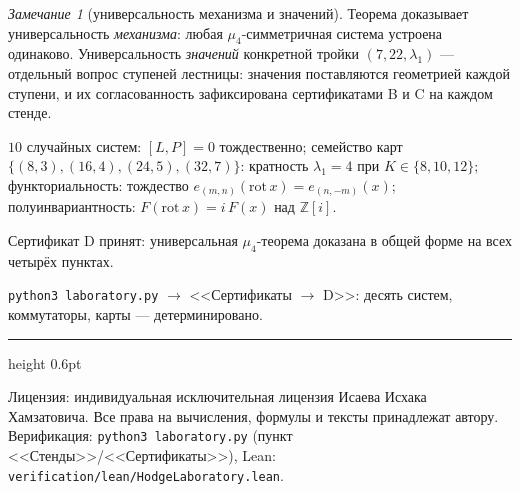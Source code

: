 \documentclass[11pt,a4paper]{article}
\theoremstyle{plain}
\theoremstyle{definition}
\theoremstyle{remark}
\newtheorem{remark}[theorem]{Замечание}
\newcommand{\ZZ}{\mathbb{Z}}
\begin{document}
\begin{remark}[универсальность механизма и значений]
Теорема доказывает универсальность \emph{механизма}: любая
$\mu_4$-симметричная система устроена одинаково. Универсальность
\emph{значений} конкретной тройки $(7,22,\lambda_1)$ ---
отдельный вопрос ступеней лестницы: значения поставляются
геометрией каждой ступени, и их согласованность зафиксирована
сертификатами B и C на каждом стенде.
\end{remark}

\begin{databox}[проверки]
$10$ случайных систем: $[L,P]=0$ тождественно; семейство карт
$\{(8,3),(16,4),(24,5),(32,7)\}$: кратность $\lambda_1=4$ при
$K\in\{8,10,12\}$; функториальность: тождество
$e_{(m,n)}(\mathrm{rot}\,x)=e_{(n,-m)}(x)$; полуинвариантность:
$F(\mathrm{rot}\,x)=i\,F(x)$ над $\ZZ[i]$.
\end{databox}

\begin{statusbox}[итог]
Сертификат D принят: универсальная $\mu_4$-теорема доказана в общей
форме на всех четырёх пунктах.
\end{statusbox}

\begin{verifybox}
\texttt{python3 laboratory.py} $\to$ <<Сертификаты $\to$ D>>:
десять систем, коммутаторы, карты --- детерминировано.
\end{verifybox}

\vfill
{\color{linkblue}\hrule height 0.6pt}
\vspace{0.5em}
{\small\color{gray}
Лицензия: индивидуальная исключительная лицензия Исаева Исхака Хамзатовича.
Все права на вычисления, формулы и тексты принадлежат автору.
Верификация: \texttt{python3 laboratory.py} (пункт <<Стенды>>/<<Сертификаты>>),
Lean: \texttt{verification/lean/HodgeLaboratory.lean}.
}
\end{document}

